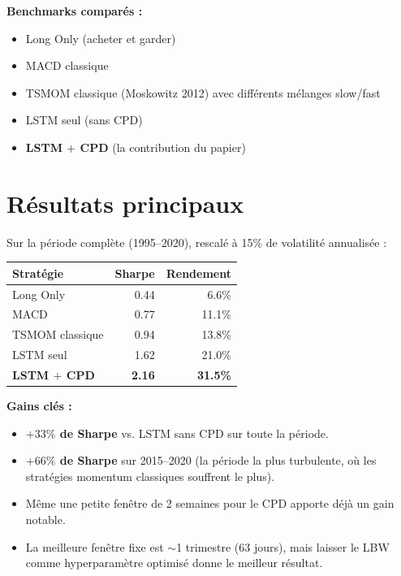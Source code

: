 \documentclass[11pt,a4paper]{article}
\begin{document}
\textbf{Benchmarks comparés :}
\begin{itemize}[leftmargin=*]
    \item Long Only (acheter et garder)
    \item MACD classique
    \item TSMOM classique (Moskowitz 2012) avec différents mélanges slow/fast
    \item LSTM seul (sans CPD)
    \item \textbf{LSTM $+$ CPD} (la contribution du papier)
\end{itemize}

\section{Résultats principaux}

Sur la période complète (1995--2020), rescalé à 15\% de volatilité annualisée :

\begin{center}
\begin{tabular}{lrr}
\toprule
\textbf{Stratégie} & \textbf{Sharpe} & \textbf{Rendement} \\
\midrule
Long Only            & 0.44 & 6.6\% \\
MACD                 & 0.77 & 11.1\% \\
TSMOM classique      & 0.94 & 13.8\% \\
LSTM seul            & 1.62 & 21.0\% \\
\textbf{LSTM $+$ CPD} & \textbf{2.16} & \textbf{31.5\%} \\
\bottomrule
\end{tabular}
\end{center}

\textbf{Gains clés :}
\begin{itemize}[leftmargin=*]
    \item \textbf{$+33\%$ de Sharpe} vs. LSTM sans CPD sur toute la période.
    \item \textbf{$+66\%$ de Sharpe} sur 2015--2020 (la période la plus turbulente, où les stratégies momentum classiques souffrent le plus).
    \item Même une petite fenêtre de 2 semaines pour le CPD apporte déjà un gain notable.
    \item La meilleure fenêtre fixe est $\sim$1 trimestre (63 jours), mais laisser le LBW comme hyperparamètre optimisé donne le meilleur résultat.
\end{itemize}
\end{document}
